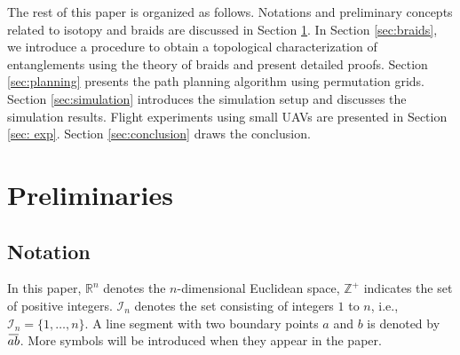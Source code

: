 \documentclass[conference]{IEEEtran}
\newcommand*{\myset}[1]{\mathcal{#1}} %
\newcommand{\overbar}[1]{\mkern 1.5mu\overline{\mkern-1.5mu#1\mkern-1.5mu}\mkern 1.5mu}
\newcommand*{\positiveinteger}{\mathbb{Z}^+}
\begin{document}
The rest of this paper is organized as follows. Notations and preliminary concepts related to isotopy and braids are discussed in Section \ref{sec:prelim}. 
In Section \ref{sec:braids}, we introduce a procedure to obtain a topological characterization of entanglements using the theory of braids and present detailed proofs.
Section \ref{sec:planning} presents the path planning algorithm using permutation grids.
Section \ref{sec:simulation} introduces the simulation setup and discusses the simulation results.
Flight experiments using small UAVs are presented in Section \ref{sec: exp}.
Section \ref{sec:conclusion} draws the conclusion.


\section{Preliminaries}\label{sec:prelim}
\subsection{Notation}
In this paper, $\mathbb{R}^n$ denotes the $n$-dimensional Euclidean space,
$\positiveinteger$ indicates the set of positive integers.
$\myset{I}_{n}$ denotes the set consisting of integers $1$ to $n$, i.e., $\myset{I}_{n} = \{1,\dots,n\}$.
A line segment with two boundary points $a$ and $b$ is denoted by $\overbar{ab}$.
More symbols will be introduced when they appear in the paper.
\end{document}
